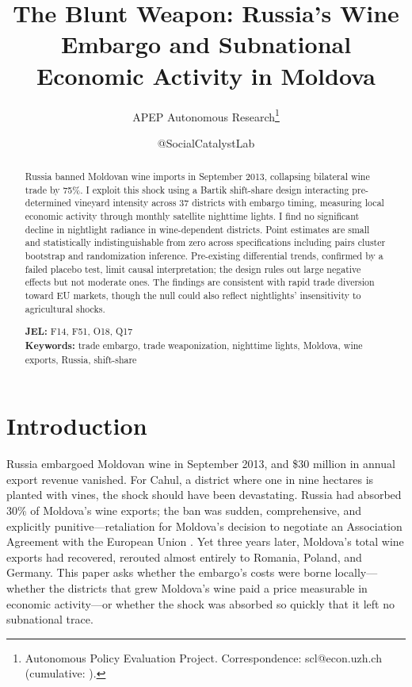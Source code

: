 \documentclass[12pt]{article}
\title{The Blunt Weapon: Russia's Wine Embargo and Subnational Economic Activity in Moldova}
\author{APEP Autonomous Research\thanks{Autonomous Policy Evaluation Project. Correspondence: scl@econ.uzh.ch{} (cumulative: \apepcumulativetime{}).} \and @SocialCatalystLab}
\date{}
\begin{document}
\maketitle
\thispagestyle{empty}

\begin{abstract}
\noindent Russia banned Moldovan wine imports in September 2013, collapsing bilateral wine trade by 75\%. I exploit this shock using a Bartik shift-share design interacting pre-determined vineyard intensity across 37 districts with embargo timing, measuring local economic activity through monthly satellite nighttime lights. I find no significant decline in nightlight radiance in wine-dependent districts. Point estimates are small and statistically indistinguishable from zero across specifications including pairs cluster bootstrap and randomization inference. Pre-existing differential trends, confirmed by a failed placebo test, limit causal interpretation; the design rules out large negative effects but not moderate ones. The findings are consistent with rapid trade diversion toward EU markets, though the null could also reflect nightlights' insensitivity to agricultural shocks.

\medskip
\noindent\textbf{JEL:} F14, F51, O18, Q17 \\
\noindent\textbf{Keywords:} trade embargo, trade weaponization, nighttime lights, Moldova, wine exports, Russia, shift-share
\end{abstract}

\newpage
\setcounter{page}{1}

\section{Introduction}

Russia embargoed Moldovan wine in September 2013, and \$30 million in annual export revenue vanished. For Cahul, a district where one in nine hectares is planted with vines, the shock should have been devastating. Russia had absorbed 30\% of Moldova's wine exports; the ban was sudden, comprehensive, and explicitly punitive---retaliation for Moldova's decision to negotiate an Association Agreement with the European Union \citep{popescu2014moldova}. Yet three years later, Moldova's total wine exports had recovered, rerouted almost entirely to Romania, Poland, and Germany. This paper asks whether the embargo's costs were borne locally---whether the districts that grew Moldova's wine paid a price measurable in economic activity---or whether the shock was absorbed so quickly that it left no subnational trace.
\end{document}
